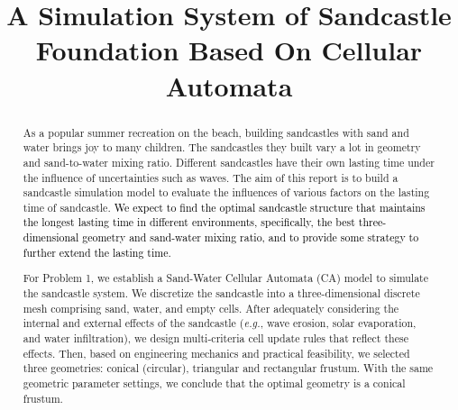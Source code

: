 \documentclass{mcmthesis}		    %
\title{\textbf{A Simulation System of Sandcastle Foundation Based On Cellular Automata}}			%
\def\eg{\mbox{\textit{e.g.}}}
\def\lyx{\textcolor{black}}
\def\gjx{\textcolor{black}}
\begin{document}
	\setlength{\parskip}{0.5\baselineskip}
	\begin{abstract}
		\hspace{1em} 
    As a popular summer recreation on the beach, building sandcastles with sand and water brings joy to many children. The sandcastles they built vary a lot in geometry and sand-to-water mixing ratio. Different sandcastles have their own lasting time under the influence of uncertainties such as waves. The aim of this report is to build a sandcastle simulation model to evaluate the influences of various factors on the lasting time of sandcastle. %
    \gjx{We expect to find the optimal sandcastle structure that maintains the longest lasting time in different environments, specifically, the best three-dimensional geometry and sand-water mixing ratio, and to provide some strategy to further extend the lasting time.}

For Problem 1, we establish a Sand-Water Cellular Automata (CA) model to 
simulate the sandcastle system. We discretize the sandcastle into a three-dimensional discrete mesh comprising sand, water, and empty cells. After adequately considering the internal and external effects of the sandcastle (\eg, wave erosion, solar evaporation, and water infiltration), we design multi-criteria cell update rules that reflect these effects. Then, based on engineering mechanics and practical feasibility, we selected three geometries: conical (circular), triangular and rectangular frustum. With the same geometric parameter settings, we conclude that the optimal geometry is a conical frustum.


\end{abstract}
\end{document}
